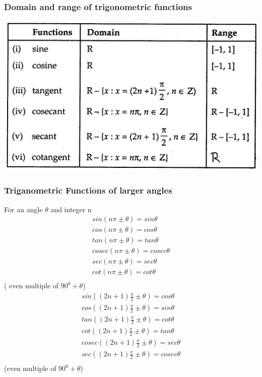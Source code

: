 \documentclass[12pt]{article}
\begin{document}
\begin{multicols}{2}
\subsubsection*{Domain and range of trigonometric functions}
              \begin{center}
                \includegraphics[scale=0.5]{im10.jpg}
              \end{center}

              \subsubsection*{Triganometric Functions of larger angles}
              For an angle $\theta$  and integer n\\
              \begin{align*}
                  sin(n \pi \pm \theta)=sin \theta \\
                  cos(n \pi \pm \theta)=cos \theta \\
                      tan(n \pi \pm \theta)=tan \theta \\
                        cosec(n \pi \pm \theta)=cosec \theta \\
                          sec(n \pi \pm \theta)=sec \theta \\
                            cot(n \pi \pm \theta)=cot \theta \\
              \end{align*}
              ( even multiple of $90^0 + \theta$)
              \begin{align*}
                  sin((2n+1) \frac{\pi}{2} \pm \theta)=cos \theta \\
                  cos((2n+1) \frac{\pi}{2} \pm \theta)=sin \theta \\
                  tan((2n+1) \frac{\pi}{2} \pm \theta)=cot \theta \\
                  cot((2n+1) \frac{\pi}{2} \pm \theta)=tan \theta \\
                  cosec((2n+1) \frac{\pi}{2} \pm \theta)=sec \theta \\
                  sec((2n+1) \frac{\pi}{2} \pm \theta)=cosec \theta \\
              \end{align*}
              (even multiple of $90^0 + \theta$)

\end{multicols}
\end{document}
